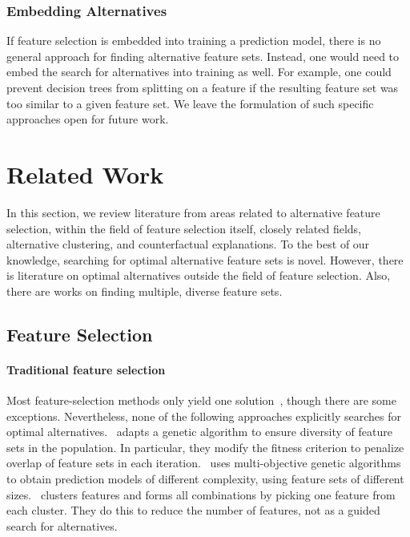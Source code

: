 \documentclass{article}
\theoremstyle{definition}
\begin{document}
\subsubsection{Embedding Alternatives}
\label{sec:approach:objectives:embedding}

If feature selection is embedded into training a prediction model, there is no general approach for finding alternative feature sets.
Instead, one would need to embed the search for alternatives into training as well.
For example, one could prevent decision trees from splitting on a feature if the resulting feature set was too similar to a given feature set.
We leave the formulation of such specific approaches open for future work.

\section{Related Work}
\label{sec:related-work}

In this section, we review literature from areas related to alternative feature selection, within the field of feature selection itself, closely related fields, alternative clustering, and counterfactual explanations.
To the best of our knowledge, searching for optimal alternative feature sets is novel.
However, there is literature on optimal alternatives outside the field of feature selection.
Also, there are works on finding multiple, diverse feature sets.

\subsection{Feature Selection}

\paragraph{Traditional feature selection}

Most feature-selection methods only yield one solution~\cite{borboudakis2021extending}, though there are some exceptions.
Nevertheless, none of the following approaches explicitly searches for optimal alternatives.
\cite{siddiqi2020genetic}~adapts a genetic algorithm to ensure diversity of feature sets in the population.
In particular, they modify the fitness criterion to penalize overlap of feature sets in each iteration.
\cite{emmanouilidis1999selecting}~uses multi-objective genetic algorithms to obtain prediction models of different complexity, using feature sets of different sizes.
\cite{mueller2021feature}~clusters features and forms all combinations by picking one feature from each cluster.
They do this to reduce the number of features, not as a guided search for alternatives.
\end{document}

